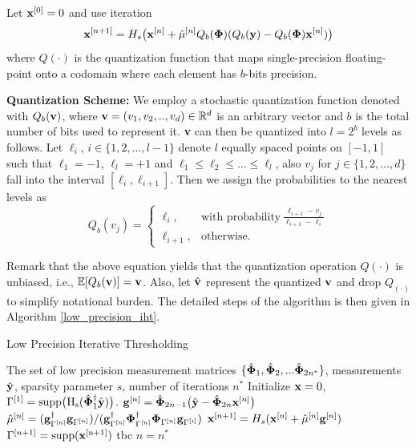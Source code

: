 \documentclass{article}
\begin{document}
Let ${\bf x}^{[0]} = 0$ and use iteration
\begin{equation} \label{modified_update_rule}
  {\bf x}^{[n+1]} = H_s\big({\bf x}^{[n]}+\hat{\mu}^{[n]} Q_b(\boldsymbol{\Phi})(Q_b({\bf y})-Q_b(\boldsymbol{\Phi}){\bf x}^{[n]})\big)  
\end{equation}
where $Q(\cdot)$ is the quantization function that maps single-precision floating-point onto a codomain where each element has $b$-bits precision.

{\bf Quantization Scheme:} We employ a stochastic quantization function denoted with $Q_b({\bf v})$, where ${\bf v}=(v_1, v_2, .., v_d) \in \mathbb{R}^d$ is an arbitrary vector and $b$ is the total number of bits used to represent it. {\bf v} can then be quantized into $l=2^b$ levels as follows. Let $\ell_i$, $i\in \{1, 2, ..., l-1 \}$ denote $l$ equally spaced points on $[-1, 1]$ such that $\ell_1= -1$, $\ell_l= +1$ and $\ell_1\leq\ell_2 \leq ... \leq \ell_l$, also $v_j$ for $j\in \{1, 2, ..., d \}$ fall into the interval $[\ell_i, \ell_{i+1}]$. Then we assign the probabilities to the nearest levels as
\[
    Q_b(v_j) = \left\{\begin{array}{lr}
        \ell_i, & \textrm{with probability} \ \frac{\ell_{i+1}-v_j}{\ell_{i+1}-\ell_i}\\
        \ell_{i+1},&\textrm{otherwise}.  \ \ \ \  \ \ \ \ \ \ \ \ \ \ \ \ \ \ 
        \end{array}
\]
  
Remark that the above equation yields that the quantization operation $Q(\cdot)$ is unbiased, i.e., $\mathbb{E}[Q_b({\bf v})] = {\bf v}$. Also, let $\hat{{\bf v}}$ represent the quantized ${\bf v}$ and drop $Q_(\cdot)$ to simplify notational burden. The detailed steps of the algorithm is then given in Algorithm \ref{low_precision_iht}.
\begin{algorithm}[h!]
   \caption{Low Precision Iterative Thresholding}
   \label{low_precision_iht}
\begin{algorithmic}
    The set of low precision measurement matrices $\{ \hat{\bf \Phi}_1, \hat{\bf \Phi}_2, ...\hat{\bf \Phi}_{2n^*}\}$, measurements $\hat{\bf y}$, sparsity parameter $s$, number of iterations $n^*$ 
   \REPEAT
   \STATE Initialize ${\bf x} = 0$, $\Gamma^{[1]} = \rm{supp}\big (H_s(\hat{\bf \Phi}_1^{\dagger}{\hat{\bf y}})\big)$.
   \FOR{$n=1$ {\bfseries to} $n^*$}
   \STATE ${\bf g}^{[n]} = {\hat{\bf \Phi}}_{2n-1} \big(\hat{{\bf y}}-{\hat{\bf \Phi}}_{2n}{\bf x}^{[n]}\big)$
   \STATE $\hat{\bf \mu}^{[n]} = ({\bf g}^{\dagger}_{\Gamma^{[n]}}{\bf g}_{\Gamma^{[n]}})/({\bf g}^{\dagger}_{\Gamma^{[n]}}{\bf \Phi}^{\dagger}_{\Gamma^{[n]}}{\bf \Phi}_{\Gamma^{[n]}}{\bf g}_{\Gamma^{[i]}})$
   \STATE ${\bf x}^{[n+1]} = H_s({\bf x}^{[n]} + \hat{\bf \mu}^{[n]} {\bf g}^{[n]})$
   \STATE $\Gamma^{[n+1]} = \rm{supp}({\bf x}^{[n+1]})$
   \STATE tbc
   \ENDFOR
   \UNTIL $n = n^*$
\end{algorithmic}
\end{algorithm}
\end{document}
